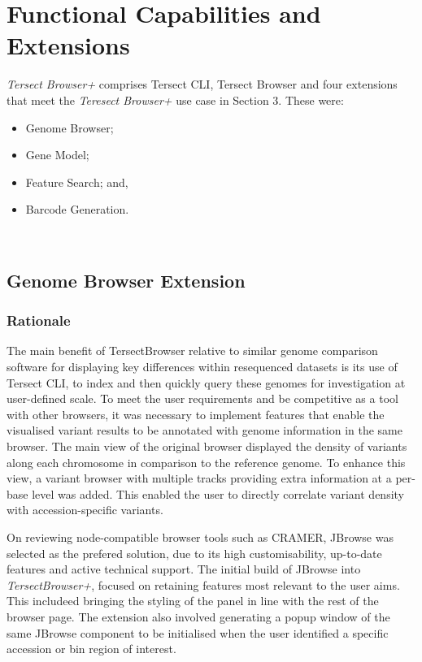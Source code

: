 \documentclass[12pt]{article}
\begin{document}
\section{Functional Capabilities and Extensions}

\textit{Tersect Browser+} comprises Tersect CLI, Tersect Browser and four extensions that meet the \textit{Teresect Browser+} use case in Section 3. These were: 

\begin{itemize}
    \item Genome Browser; 
    \item Gene Model; 
    \item Feature Search; and, 
    \item Barcode Generation.
\end{itemize}

\\

\subsection{Genome Browser Extension}
\label{sec:Browser}
\subsubsection{Rationale}
The main benefit of TersectBrowser relative to similar genome comparison software for displaying key differences within resequenced datasets is its use of Tersect CLI, to index and then quickly query these genomes for investigation at user-defined scale. To meet the user requirements and be competitive as a tool with other browsers, it was necessary to implement features that enable the visualised variant results to be annotated with genome information in the same browser. The main view of the original browser displayed the density of variants along each chromosome in comparison to the reference genome. To enhance this view, a variant browser with multiple tracks providing extra information at a per-base level was added. This enabled the user to directly correlate variant density with accession-specific variants. 

On reviewing node-compatible browser tools such as CRAMER, JBrowse was selected as the prefered solution, due to its high customisability, up-to-date features and active technical support. The initial build of JBrowse into \textit{TersectBrowser+}, focused on retaining features most relevant to the user aims. This includeed bringing the styling of the panel in line with the rest of the browser page. The extension also involved generating a popup window of the same JBrowse component to be initialised when the user identified a specific accession or bin region of interest. 
\end{document}
